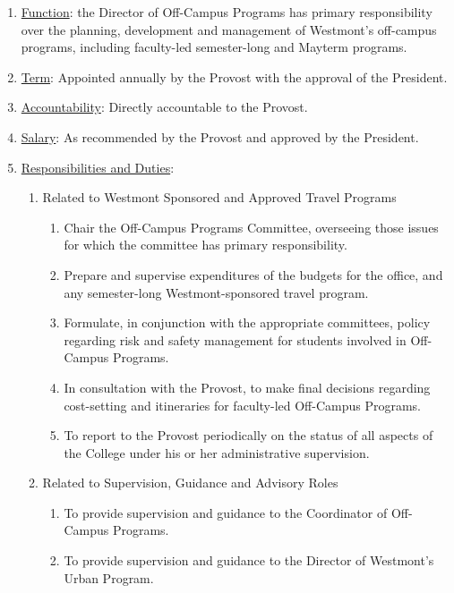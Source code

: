 \documentclass[letterpaper, 11pt]{article}
\newcounter{subsubparagraph}
\begin{document}
					\begin{enumerate}[label=\alph*)]
						\item{\underline{Function}:  the Director of Off-Campus Programs has primary responsibility over the planning, development and management of Westmont's off-campus programs, including faculty-led semester-long and Mayterm programs.}
						\item{\underline{Term}:  Appointed annually by the Provost with the approval of the President.}
						\item{\underline{Accountability}:  Directly accountable to the Provost.}
						\item{\underline{Salary}:  As recommended by the Provost and approved by the President.}
						\item{\underline{Responsibilities and Duties}:
							\begin{enumerate}[label=\arabic*)]
								\item{Related to Westmont Sponsored and Approved Travel Programs
									\begin{enumerate}[label=(\alph*)]
										\item{Chair the Off-Campus Programs Committee, overseeing those issues for which the committee has primary responsibility.}
										\item{Prepare and supervise expenditures of the budgets for the office, and any semester-long Westmont-sponsored travel program.}
										\item{Formulate, in conjunction with the appropriate committees, policy regarding risk and safety management for students involved in Off-Campus Programs.}
										\item{In consultation with the Provost, to make final decisions regarding cost-setting and itineraries for faculty-led Off-Campus Programs.}
										\item{To report to the Provost periodically on the status of all aspects of the College under his or her administrative supervision.}
									\end{enumerate}
								}
								\item{ Related to Supervision, Guidance and Advisory Roles
									\begin{enumerate}[label=(\alph*)]
										\item{To provide supervision and guidance to the Coordinator of Off-Campus Programs.}
										\item{To provide supervision and guidance to the Director of Westmont's Urban Program.}
									\end{enumerate}
								}
							\end{enumerate}
						}
					\end{enumerate}
\end{document}
